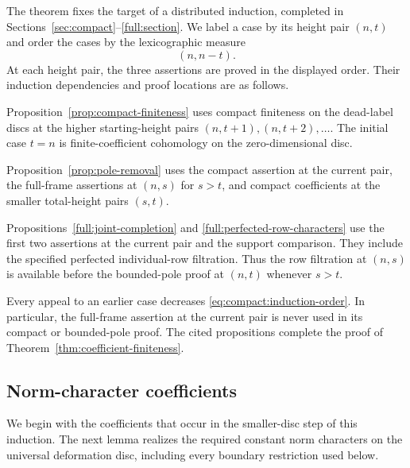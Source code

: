 The theorem fixes the target of a distributed induction, completed in
Sections~\ref{sec:compact}--\ref{full:section}. We label a case by its
height pair $(n,t)$ and order the cases by the lexicographic measure
\begin{equation}\label{eq:compact:induction-order}
                         (n,n-t).
\end{equation}
At each height pair, the three assertions are proved in the displayed order.
Their induction dependencies and proof locations are as follows.
\begin{description}[style=nextline,leftmargin=0pt,labelsep=0pt,itemsep=4pt]
\item[Compact coefficients (1).]
Proposition~\ref{prop:compact-finiteness} uses compact finiteness on the
dead-label discs at the higher starting-height pairs
$(n,t+1),(n,t+2),\ldots$. The initial case $t=n$ is finite-coefficient
cohomology on the zero-dimensional disc.
\item[Bounded poles (2).]
Proposition~\ref{prop:pole-removal} uses the compact assertion at the
current pair, the full-frame assertions at $(n,s)$ for $s>t$, and compact
coefficients at the smaller total-height pairs $(s,t)$.
\item[Full frame (3).]
Propositions~\ref{full:joint-completion} and
\ref{full:perfected-row-characters} use the first two assertions at the
current pair and the support comparison. They include the specified
perfected individual-row filtration. Thus the row filtration at $(n,s)$
is available before the bounded-pole proof at $(n,t)$ whenever $s>t$.
\end{description}
Every appeal to an earlier case decreases \eqref{eq:compact:induction-order}.
In particular, the full-frame assertion at the current pair is never used
in its compact or bounded-pole proof. The cited propositions complete the
proof of Theorem~\ref{thm:coefficient-finiteness}.

\subsection{Norm-character coefficients}

We begin with the coefficients that occur in the smaller-disc
step of this induction. The next lemma realizes the required
constant norm characters on the universal deformation disc,
including every boundary restriction used below.

